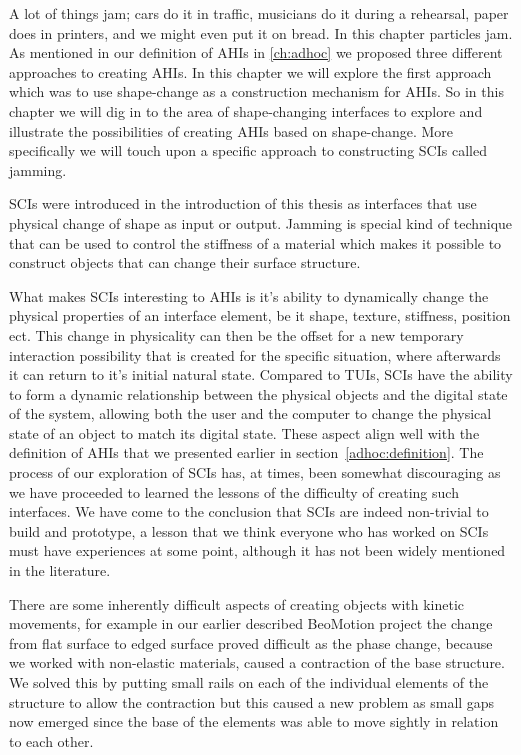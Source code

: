 
A lot of things jam; cars do it in traffic, musicians do it during a rehearsal, paper does in printers, and we might even put it on bread.
In this chapter particles jam.
\blank
As mentioned in our definition of AHIs in \autoref{ch:adhoc} we proposed three different approaches to creating AHIs.
In this chapter we will explore the first approach which was to use shape-change as a construction mechanism for AHIs.
So in this chapter we will dig in to the area of shape-changing interfaces to explore and illustrate the possibilities of creating AHIs based on shape-change.
More specifically we will touch upon a specific approach to constructing SCIs called jamming.

SCIs were introduced in the introduction of this thesis as interfaces that use physical change of shape as input or output.
Jamming is special kind of technique that can be used to control the stiffness of a material which makes it possible to construct objects that can change their surface structure.

What makes SCIs interesting to AHIs is it's ability to dynamically change the physical properties of an interface element, be it shape, texture, stiffness, position ect.
This change in physicality can then be the offset for a new temporary interaction possibility that is created for the specific situation, where afterwards it can return to it's initial natural state.
Compared to TUIs, SCIs have the ability to form a dynamic relationship between the physical objects and the digital state of the system, allowing both the user and the computer to change the physical state of an object to match its digital state.
These aspect align well with the definition of AHIs that we presented earlier in section~\ref{adhoc:definition}.
\blank
The process of our exploration of SCIs has, at times, been somewhat discouraging as we have proceeded to learned the lessons of the difficulty of creating such interfaces.
We have come to the conclusion that SCIs are indeed non-trivial to build and prototype, a lesson that we think everyone who has worked on SCIs must have experiences at some point, although it has not been widely mentioned in the literature. 

There are some inherently difficult aspects of creating objects with kinetic movements, for example in our earlier described BeoMotion project the change from flat surface to edged surface proved difficult as the phase change, because we worked with non-elastic materials, caused a contraction of the base structure.
We solved this by putting small rails on each of the individual elements of the structure to allow the contraction but this caused a new problem as small gaps now emerged since the base of the elements was able to move sightly in relation to each other.


